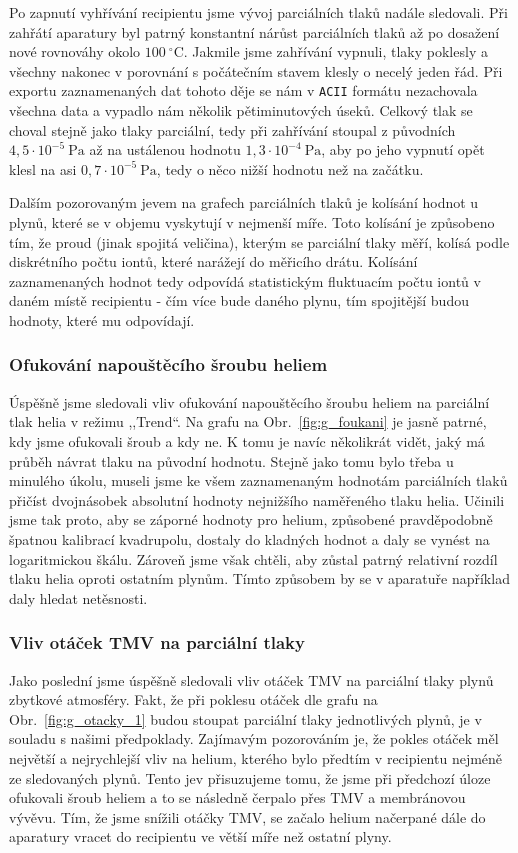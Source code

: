 \documentclass[english]{article}
\newcommand{\unit}[1]{~\mathrm{#1}}
\newcommand{\degc}{^\circ C}
\begin{document}
			Po zapnutí vyhřívání recipientu jsme vývoj parciálních tlaků nadále sledovali. Při zahřátí aparatury byl patrný konstantní nárůst parciálních tlaků až po dosažení nové rovnováhy okolo $100\unit{\degc}$. Jakmile jsme zahřívání vypnuli, tlaky poklesly a všechny nakonec v porovnání s počátečním stavem klesly o necelý jeden řád. Při exportu zaznamenaných dat tohoto děje se nám v \texttt{ACII} formátu nezachovala všechna data a vypadlo nám několik pětiminutových úseků. Celkový tlak se choval stejně jako tlaky parciální, tedy při zahřívání stoupal z původních $4,5\cdot 10^{-5}\unit{Pa}$ až na ustálenou hodnotu $1,3\cdot 10^{-4}\unit{Pa}$, aby po jeho vypnutí opět klesl na asi $0,7 \cdot 10^{-5}\unit{Pa}$, tedy o něco nižší hodnotu než na začátku.
			
			Dalším pozorovaným jevem na grafech parciálních tlaků je kolísání hodnot u plynů, které se v objemu vyskytují v nejmenší míře. Toto kolísání je způsobeno tím, že proud (jinak spojitá veličina), kterým se parciální tlaky měří, kolísá podle diskrétního počtu iontů, které narážejí do měřicího drátu. Kolísání zaznamenaných hodnot tedy odpovídá statistickým fluktuacím počtu iontů v daném místě recipientu - čím více bude daného plynu, tím spojitější budou hodnoty, které mu odpovídají.
		
		\subsubsection{Ofukování napouštěcího šroubu heliem}
			Úspěšně jsme sledovali vliv ofukování napouštěcího šroubu heliem na parciální tlak helia v režimu ,,Trend``. Na grafu na Obr.~\ref{fig:g_foukani} je jasně patrné, kdy jsme ofukovali šroub a kdy ne. K tomu je navíc několikrát vidět, jaký má průběh návrat tlaku na původní hodnotu. Stejně jako tomu bylo třeba u minulého úkolu, museli jsme ke všem zaznamenaným hodnotám parciálních tlaků přičíst dvojnásobek absolutní hodnoty nejnižšího naměřeného tlaku helia. Učinili jsme tak proto, aby se záporné hodnoty pro helium, způsobené pravděpodobně špatnou kalibrací kvadrupolu, dostaly do kladných hodnot a daly se vynést na logaritmickou škálu. Zároveň jsme však chtěli, aby zůstal patrný relativní rozdíl tlaku helia oproti ostatním plynům. Tímto způsobem by se v aparatuře například daly hledat netěsnosti.
			
		\subsubsection{Vliv otáček TMV na parciální tlaky}
			Jako poslední jsme úspěšně sledovali vliv otáček TMV na parciální tlaky plynů zbytkové atmosféry. Fakt, že při poklesu otáček dle grafu na Obr.~\ref{fig:g_otacky_1} budou stoupat parciální tlaky jednotlivých plynů, je v souladu s našimi předpoklady. Zajímavým pozorováním je, že pokles otáček měl největší a nejrychlejší vliv na helium, kterého bylo předtím v recipientu nejméně ze sledovaných plynů. Tento jev přisuzujeme tomu, že jsme při předchozí úloze ofukovali šroub heliem a to se následně čerpalo přes TMV a membránovou vývěvu. Tím, že jsme snížili otáčky TMV, se začalo helium načerpané dále do aparatury vracet do recipientu ve větší míře než ostatní plyny.
						
\end{document}
